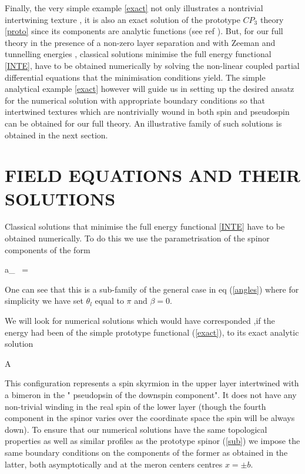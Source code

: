 Finally, the very simple example \ref{exact} not only illustrates a nontrivial
intertwining texture , it is also an exact solution of the prototype $CP_{3}$
theory \ref{proto}
 since its components are analytic functions (see ref \cite{Raj}).
But, for our full theory in the presence of a non-zero layer
separation and with Zeeman and tunnelling energies ,
classical  solutions minimise the full energy functional  \ref{INTE}, 
 have to be obtained numerically by solving the 
non-linear coupled partial differential 
equations that the minimisation conditions yield. The simple analytical
example \ref{exact} however will guide us in setting up the desired
ansatz for the numerical solution with appropriate boundary conditions
 so that  intertwined textures which are nontrivially wound in both spin
 and pseudospin can be obtained for our full theory. An illustrative
 family of such solutions is obtained in the next section.




\section{FIELD EQUATIONS AND THEIR SOLUTIONS}
Classical solutions that minimise the full energy functional \ref{INTE}
 have to be obtained numerically. To do this we use the parametrisation
 of the spinor components of the form
 
\beq  a_{\sigma} \ = \  \label{ansatz} \eeq

One can see that this is a sub-family of the general case in eq (\ref{angles})
where for simplicity we have set  $\theta_{l}$  equal
to $\pi$ and  $\beta = 0$.

We will look for numerical solutions which
 would have corresponded ,if  the energy had been of the simple prototype
 functional (\ref{exact}), to its exact analytic solution

\beq   A  \label{sub} \eeq

 This configuration represents a spin skyrmion in the upper layer intertwined 
with a bimeron in the " pseudopsin of the downspin 
component". It does not have any non-trivial winding in the real spin of the
lower layer (though the fourth component in the spinor
 varies over the coordinate space the spin will be 
always down). To ensure that our numerical solutions have the
same topological properties as well as similar profiles as
  the prototype spinor (\ref{sub}) we impose
the same boundary conditions on the components of the former as obtained in
the latter, both 
 asymptotically and at the meron centers 
  centres $x = \pm b$.

